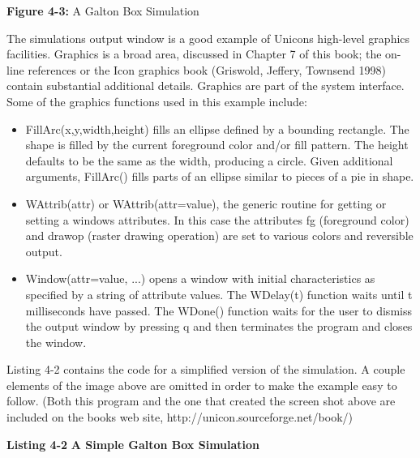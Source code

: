 {\sffamily\bfseries Figure 4-3:}
{\sffamily A Galton Box Simulation}

\bigskip

The simulation{\textquotesingle}s output window is a good example of
Unicon{\textquotesingle}s high-level graphics facilities. Graphics is a
broad area, discussed in Chapter 7 of this book; the on-line references
or the Icon graphics book (Griswold, Jeffery, Townsend 1998) contain
substantial additional details. Graphics are part of the system
interface. Some of the graphics functions used in this example include:

\begin{itemize}
\item \textsf{FillArc(x,y,width,height)} fills an ellipse defined by a
bounding rectangle. The shape is filled by the current foreground color
and/or fill pattern. The height defaults to be the same as the width,
producing a circle. Given additional arguments, \textsf{FillArc()
}fills parts of an ellipse similar to pieces of a pie in shape.
\item \textsf{WAttrib({\textquotedbl}attr{\textquotedbl})} or
\textsf{WAttrib({\textquotedbl}attr=value{\textquotedbl})}, the generic
routine for getting or setting a window{\textquotesingle}s attributes.
In this case the attributes \textsf{fg} (foreground color) and
\textsf{drawop} (raster drawing operation) are set to various colors
and reversible output.
\item \textsf{Window({\textquotedbl}attr=value{\textquotedbl}, ...)}
opens a window with initial characteristics as specified by a string of
attribute values. The \textsf{WDelay(t)} function waits until
\textsf{t} milliseconds have passed. The \textsf{WDone()} function
waits for the user to dismiss the output window by pressing
\textsf{{\textquotedbl}q{\textquotedbl}} and then terminates the
program and closes the window.
\end{itemize}
Listing 4-2 contains the code for a simplified version of the
simulation. A couple elements of the image above are omitted in order
to make the example easy to follow. (Both this program and the one that
created the screen shot above are included on the
book{\textquotesingle}s web site, http://unicon.sourceforge.net/book/)

{\sffamily\bfseries Listing 4-2}
{\sffamily\bfseries A Simple Galton Box Simulation}

